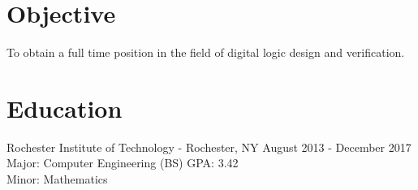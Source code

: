 \documentclass[a4paper,margin,line]{resume}
\newcommand{\rdate}[1]{\hfill {\small #1}}
\begin{document}
\begin{resume}
\section{\mysidestyle Objective}
    To obtain a full time position in the field of digital logic design and verification.


\section{\mysidestyle Education}
    \begin{compactdesc}
        \item[Rochester Institute of Technology] - Rochester, NY \rdate{August 2013 - December 2017} \\
            Major: Computer Engineering (BS) \rdate{GPA: 3.42}\\
            Minor: Mathematics \\
    \end{compactdesc}


\end{resume}
\end{document}
